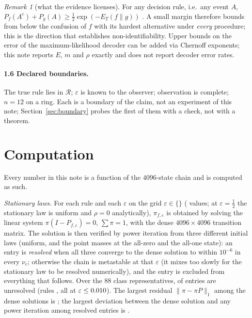 \documentclass[11pt,a4paper]{article}
\theoremstyle{remark}
\newtheorem{remark}{Remark}
\newcommand{\eps}{\varepsilon}
\newcommand{\R}{\mathcal{R}}
\begin{document}
\begin{remark}[what the evidence licenses]\label{rem:bh}
For any decision rule, i.e.\ any event $A$, $P_f(A^c)+P_g(A)\ge\tfrac12\exp(-E_T(f\|g))$ \citep{BretagnolleHuber1979,Tsybakov2009}. A small margin therefore bounds from below the confusion of $f$ with its hardest alternative under \emph{every} procedure; this is the direction that establishes non-identifiability. Upper bounds on the error of the maximum-likelihood decoder can be added via Chernoff exponents; this note reports $E$, $m$ and $\rho$ exactly and does not report decoder error rates.
\end{remark}

\paragraph{1.6 Declared boundaries.}
The true rule lies in $\R$; $\eps$ is known to the observer; observation is complete; $n=12$ on a ring. Each is a boundary of the claim, not an experiment of this note; Section~\ref{sec:boundary} probes the first of them with a check, not with a theorem.

\section{Computation}\label{sec:comp}

Every number in this note is a function of the $4096$-state chain and is computed as such.

\emph{Stationary laws.} For each rule and each $\eps$ on the grid $\eps\in\{$\EpsGrid$\}$ (\EpsGridN{} values; at $\eps=\tfrac12$ the stationary law is uniform and $\rho=0$ analytically), $\pi_{f,\eps}$ is obtained by solving the linear system $\pi(I-P_{f,\eps})=0$, $\sum\pi=1$, with the dense $4096\times4096$ transition matrix. The solution is then verified by power iteration from three different initial laws (uniform, and the point masses at the all-zero and the all-one state): an entry is \emph{resolved} when all three converge to the dense solution to within $10^{-6}$ in every $\nu_c$; otherwise the chain is metastable at that $\eps$ (it mixes too slowly for the stationary law to be resolved numerically), and the entry is excluded from everything that follows. Over the $88$ class representatives, \StatUnresolved{} of \StatEntries{} entries are unresolved (rules \StatUnresolvedRules, all at $\eps\le\StatUnresolvedEpsMax$). The largest residual $\|\pi-\pi P\|_1$ among the dense solutions is \StatMaxResidual; the largest deviation between the dense solution and any power iteration among resolved entries is \StatMaxCheckDevResolved.
\end{document}
